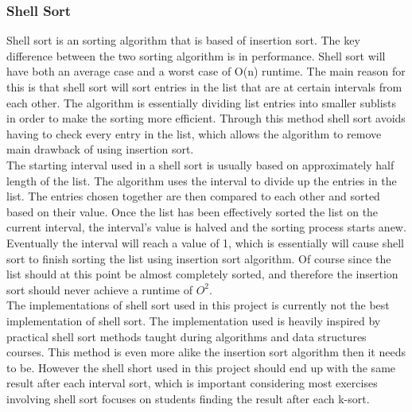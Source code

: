 \subsubsection{Shell Sort}
Shell sort is an sorting algorithm that is based of insertion sort. The key difference between the two sorting algorithm is in performance. Shell sort will have both an average case and a worst case of O(n) runtime. The main reason for this is that shell sort will sort entries in the list that are at certain intervals from each other. The algorithm is essentially dividing list entries into smaller sublists in order to make the sorting more efficient. Through this method shell sort avoids having to check every entry in the list, which allows the algorithm to remove main drawback of using insertion sort. 
\\The starting interval used in a shell sort is usually based on approximately half length of the list. The algorithm uses the interval to divide up the entries in the list. The entries chosen together are then compared to each other and sorted based on their value. Once the list has been effectively sorted the list on the current interval, the interval's value is halved and the sorting process starts anew. Eventually the interval will reach a value of 1, which is essentially will cause shell sort to finish sorting the list using insertion sort algorithm. Of course since the list should at this point be almost completely sorted, and therefore the insertion sort should never achieve a runtime of $O^2$.
\\The implementations of shell sort used in this project is currently not the best implementation of shell sort. The implementation used is heavily inspired by practical shell sort methods taught during algorithms and data structures courses. This method is even more alike the insertion sort algorithm then it needs to be. However the shell short used in this project should end up with the same result after each interval sort, which is important considering most exercises involving shell sort focuses on students finding the result after each k-sort.  